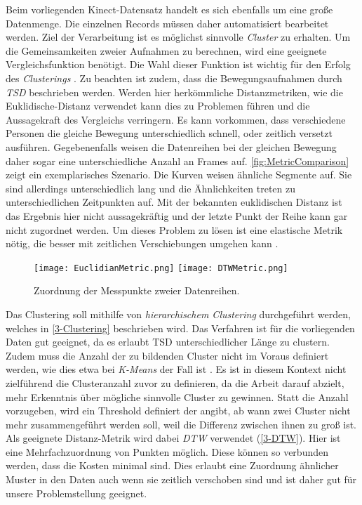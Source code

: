 Beim vorliegenden Kinect-Datensatz handelt es sich ebenfalls um eine große Datenmenge.
Die einzelnen Records müssen daher automatisiert bearbeitet werden.
Ziel der Verarbeitung ist es möglichst sinnvolle \emph{Cluster} zu erhalten.
Um die Gemeinsamkeiten zweier Aufnahmen zu berechnen,
wird eine geeignete Vergleichsfunktion benötigt.
Die Wahl dieser Funktion ist wichtig für den Erfolg des \emph{Clusterings} \citep{warren_liao_clustering_2005}.
Zu beachten ist zudem, dass die Bewegungsaufnahmen durch \emph{\ac{TSD}} beschrieben werden.
Werden hier herkömmliche Distanzmetriken, wie die Euklidische-Distanz verwendet
kann dies zu Problemen führen und die Aussagekraft des Vergleichs verringern.
Es kann vorkommen, dass verschiedene Personen die gleiche Bewegung unterschiedlich schnell,
oder zeitlich versetzt ausführen.
Gegebenenfalls weisen die Datenreihen bei der gleichen Bewegung daher sogar eine unterschiedliche Anzahl an Frames auf.
\autoref{fig:MetricComparison} zeigt ein exemplarisches Szenario.
Die Kurven weisen ähnliche Segmente auf.
Sie sind allerdings unterschiedlich lang und die Ähnlichkeiten treten zu unterschiedlichen Zeitpunkten auf.
Mit der bekannten euklidischen Distanz ist das Ergebnis hier nicht aussagekräftig
und der letzte Punkt der Reihe kann gar nicht zugordnet werden.
Um dieses Problem zu lösen ist eine elastische Metrik nötig,
die besser mit zeitlichen Verschiebungen umgehen kann \citep{aghabozorgi_time-series_2015}.

\begin{figure}[ht]
    \begin{center}
    \texttt{[image: EuclidianMetric.png]}
    \texttt{[image: DTWMetric.png]}
    \end{center}
    \caption{Zuordnung der Messpunkte zweier Datenreihen.}
    \label{fig:MetricComparison}
\end{figure}

Das Clustering soll mithilfe von \emph{hierarchischem Clustering} durchgeführt werden,
welches in \autoref{3-Clustering} beschrieben wird.
Das Verfahren ist für die vorliegenden Daten gut geeignet,
da es erlaubt \ac{TSD} unterschiedlicher Länge zu clustern.
Zudem muss die Anzahl der zu bildenden Cluster nicht im Voraus definiert werden,
wie dies etwa bei \emph{K-Means} der Fall ist \citep{aghabozorgi_time-series_2015}.
Es ist in diesem Kontext nicht zielführend die Clusteranzahl zuvor zu definieren,
da die Arbeit darauf abzielt, mehr Erkenntnis über mögliche sinnvolle Cluster zu gewinnen.
Statt die Anzahl vorzugeben, wird ein Threshold definiert der angibt,
ab wann zwei Cluster nicht mehr zusammengeführt werden soll,
weil die Differenz zwischen ihnen zu groß ist.
Als geeignete Distanz-Metrik wird dabei \emph{\ac{DTW}} verwendet (\autoref{3-DTW}).
Hier ist eine Mehrfachzuordnung von Punkten möglich.
Diese können so verbunden werden, dass die Kosten minimal sind.
Dies erlaubt eine Zuordnung ähnlicher Muster in den Daten auch wenn sie zeitlich verschoben sind
und ist daher gut für unsere Problemstellung geeignet.